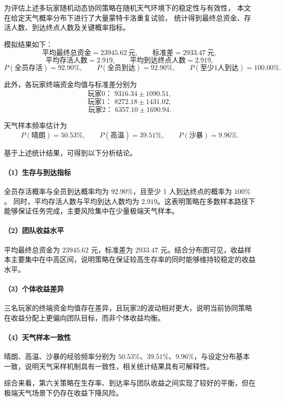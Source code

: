 \documentclass[UTF8,a4paper,12pt]{ctexart}
\begin{document}
为评估上述多玩家随机动态协同策略在随机天气环境下的稳定性与有效性，
本文在给定天气概率分布下进行了大量蒙特卡洛重复试验，
统计得到最终总资金、存活人数、到达终点人数及关键概率指标。

模拟结果如下：
\[
\text{平均最终总资金}=23945.62\ \text{元},\qquad
\text{标准差}=2933.47\ \text{元},
\]
\[
\text{平均存活人数}=2.919,\qquad
\text{平均到达终点人数}=2.919,
\]
\[
P(\text{全员存活})=92.90\%,\qquad
P(\text{全员到达})=92.90\%,\qquad
P(\text{至少1人到达})=100.00\%.
\]

此外，各玩家终端资金均值与标准差分别为
\[
\text{玩家0： } 9316.34 \pm 1090.51,
\]
\[
\text{玩家1： } 8272.18 \pm 1431.02,
\]
\[
\text{玩家2： } 6357.10 \pm 1690.94.
\]

天气样本频率估计为
\[
P(\text{晴朗})=50.53\%,\qquad
P(\text{高温})=39.51\%,\qquad
P(\text{沙暴})=9.96\%.
\]

基于上述统计结果，可得到以下分析结论。

\paragraph{（1）生存与到达指标}
全员存活概率与全员到达概率均为 $92.90\%$，且至少 1 人到达终点的概率为 $100\%$。
同时，平均存活人数与平均到达人数均为 $2.919$。这表明策略在多数样本路径下能够保证任务完成，主要风险集中在少量极端天气样本。

\paragraph{（2）团队收益水平}
平均最终总资金为 $23945.62$ 元，标准差为 $2933.47$ 元。结合分布图可见，收益样本主要集中在中高区间，说明策略在保证较高生存率的同时能够维持较稳定的收益水平。

\paragraph{（3）个体收益差异}
三名玩家的终端资金均值存在差异，且玩家2的波动相对更大，说明当前协同策略在收益分配上更偏向团队目标，而非个体收益均衡。

\paragraph{（4）天气样本一致性}
晴朗、高温、沙暴的经验频率分别为 $50.53\%$、$39.51\%$、$9.96\%$，与设定分布基本一致，说明天气采样机制具有一致性，相关统计结果具有可解释性。

综合来看，第六关策略在生存率、到达率与团队收益之间实现了较好的平衡，但在极端天气场景下仍存在收益下降风险。
\end{document}

